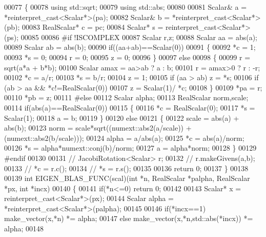 \begin{DoxyCode}
00077 \{
00078   \textcolor{keyword}{using} std::sqrt;
00079   \textcolor{keyword}{using} std::abs;
00080 
00081   Scalar& a = *\textcolor{keyword}{reinterpret\_cast<}Scalar*\textcolor{keyword}{>}(pa);
00082   Scalar& b = *\textcolor{keyword}{reinterpret\_cast<}Scalar*\textcolor{keyword}{>}(pb);
00083   RealScalar* c = pc;
00084   Scalar* s = \textcolor{keyword}{reinterpret\_cast<}Scalar*\textcolor{keyword}{>}(ps);
00085 
00086 \textcolor{preprocessor}{  #if !ISCOMPLEX}
00087   Scalar r,z;
00088   Scalar aa = abs(a);
00089   Scalar ab = abs(b);
00090   \textcolor{keywordflow}{if}((aa+ab)==Scalar(0))
00091   \{
00092     *c = 1;
00093     *s = 0;
00094     r = 0;
00095     z = 0;
00096   \}
00097   \textcolor{keywordflow}{else}
00098   \{
00099     r = sqrt(a*a + b*b);
00100     Scalar amax = aa>ab ? a : b;
00101     r = amax>0 ? r : -r;
00102     *c = a/r;
00103     *s = b/r;
00104     z = 1;
00105     \textcolor{keywordflow}{if} (aa > ab) z = *s;
00106     \textcolor{keywordflow}{if} (ab > aa && *c!=RealScalar(0))
00107       z = Scalar(1)/ *c;
00108   \}
00109   *pa = r;
00110   *pb = z;
00111 \textcolor{preprocessor}{  #else}
00112   Scalar alpha;
00113   RealScalar norm,scale;
00114   \textcolor{keywordflow}{if}(abs(a)==RealScalar(0))
00115   \{
00116     *c = RealScalar(0);
00117     *s = Scalar(1);
00118     a = b;
00119   \}
00120   \textcolor{keywordflow}{else}
00121   \{
00122     scale = abs(a) + abs(b);
00123     norm = scale*sqrt((numext::abs2(a/scale)) + (numext::abs2(b/scale)));
00124     alpha = a/abs(a);
00125     *c = abs(a)/norm;
00126     *s = alpha*numext::conj(b)/norm;
00127     a = alpha*norm;
00128   \}
00129 \textcolor{preprocessor}{  #endif}
00130 
00131 \textcolor{comment}{//   JacobiRotation<Scalar> r;}
00132 \textcolor{comment}{//   r.makeGivens(a,b);}
00133 \textcolor{comment}{//   *c = r.c();}
00134 \textcolor{comment}{//   *s = r.s();}
00135 
00136   \textcolor{keywordflow}{return} 0;
00137 \}
00138 
00139 \textcolor{keywordtype}{int} EIGEN\_BLAS\_FUNC(scal)(\textcolor{keywordtype}{int} *n, RealScalar *palpha, RealScalar *px, \textcolor{keywordtype}{int} *incx)
00140 \{
00141   \textcolor{keywordflow}{if}(*n<=0) \textcolor{keywordflow}{return} 0;
00142 
00143   Scalar* x = \textcolor{keyword}{reinterpret\_cast<}Scalar*\textcolor{keyword}{>}(px);
00144   Scalar alpha = *\textcolor{keyword}{reinterpret\_cast<}Scalar*\textcolor{keyword}{>}(palpha);
00145 
00146   \textcolor{keywordflow}{if}(*incx==1)  make\_vector(x,*n) *= alpha;
00147   \textcolor{keywordflow}{else}          make\_vector(x,*n,std::abs(*incx)) *= alpha;
00148 

\end{DoxyCode}
